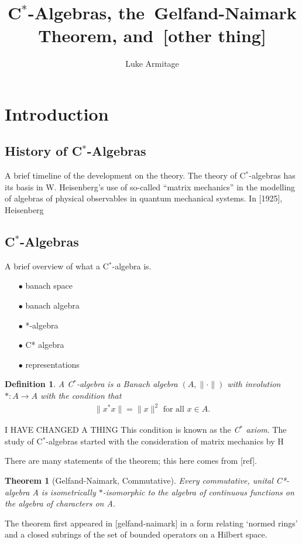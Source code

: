 \documentclass[12pt,a4paper]{amsart}
\author{Luke Armitage}
\title{C$^\ast$-Algebras, the~Gelfand-Naimark Theorem, and~[other thing]}
\theoremstyle{plain}
\newtheorem*{thm*}{Theorem}
\theoremstyle{defn}
\newtheorem{defn}{Definition}
\begin{document}
\maketitle
\section{Introduction}
\subsection{History of C$^\ast$-Algebras}
	A brief timeline of the development on the theory.
The theory of C$^\ast$-algebras has its basis in W. Heisenberg's use of so-called ``matrix mechanics'' in the modelling of algebras of physical observables in quantum mechanical systems. In [1925], Heisenberg 
	
\subsection{C$^\ast$-Algebras}
	A brief overview of what a C$^\ast$-algebra is.
\begin{enumerate}
	\item[$\bullet$] banach space
	\item[$\bullet$] banach algebra
	\item[$\bullet$] *-algebra
	\item[$\bullet$] C* algebra
	\item[$\bullet$] representations
\end{enumerate}
\begin{defn}
A \emph{C$^\ast$-algebra} is a Banach algebra $(A, \| \cdot \|)$ with involution $\ast : A \to A$ with the condition that
\begin{align*}
	\|x ^\ast x\| = \|x\|^2 \mbox{ for all } x \in A.
\end{align*}
\end{defn}
 I HAVE CHANGED A THING
This condition is known as the \emph{C$^\ast$ axiom}. The study of C$^\ast$-algebras started with the consideration of matrix mechanics by H

There are many statements of the theorem; this here comes from [ref].
\begin{thm*}[Gelfand-Naimark, Commutative]
	Every commutative, unital C*-algebra A is isometrically $\ast$-isomorphic to the algebra of continuous functions on the algebra of characters on A.

\end{thm*}
The theorem first appeared in [gelfand-naimark] in a form relating `normed rings' and a closed subrings of the set of bounded operators on a Hilbert space.
\end{document}
